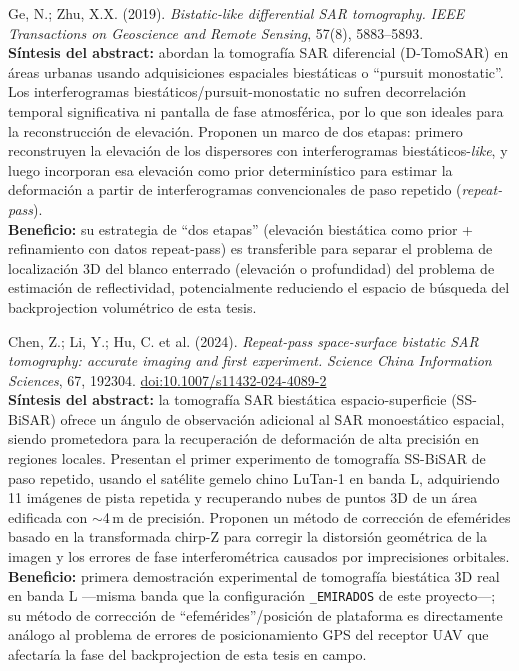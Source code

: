 \documentclass[11pt,a4paper]{article}
\begin{document}
\begin{enumerate}[label=\textbf{[C\arabic*]}, leftmargin=2.2cm, itemsep=10pt]

\item Ge, N.; Zhu, X.X. (2019). \textit{Bistatic-like differential SAR
tomography.} \emph{IEEE Transactions on Geoscience and Remote Sensing},
57(8), 5883--5893. \cite{ge2019}\\
\textbf{Síntesis del abstract:} abordan la tomografía SAR diferencial
(D-TomoSAR) en áreas urbanas usando adquisiciones espaciales biestáticas o
``pursuit monostatic''. Los interferogramas biestáticos/pursuit-monostatic
no sufren decorrelación temporal significativa ni pantalla de fase
atmosférica, por lo que son ideales para la reconstrucción de elevación.
Proponen un marco de dos etapas: primero reconstruyen la elevación de los
dispersores con interferogramas biestáticos-\emph{like}, y luego incorporan
esa elevación como prior determinístico para estimar la deformación a
partir de interferogramas convencionales de paso repetido
(\emph{repeat-pass}).\\
\textbf{Beneficio:} su estrategia de ``dos etapas'' (elevación biestática
como prior + refinamiento con datos repeat-pass) es transferible para
separar el problema de localización 3D del blanco enterrado (elevación o
profundidad) del problema de estimación de reflectividad, potencialmente
reduciendo el espacio de búsqueda del backprojection volumétrico de esta
tesis.

\item Chen, Z.; Li, Y.; Hu, C. et al. (2024). \textit{Repeat-pass
space-surface bistatic SAR tomography: accurate imaging and first
experiment.} \emph{Science China Information Sciences}, 67, 192304.
\href{https://doi.org/10.1007/s11432-024-4089-2}{doi:10.1007/s11432-024-4089-2}
\cite{chenz2024}\\
\textbf{Síntesis del abstract:} la tomografía SAR biestática
espacio-superficie (SS-BiSAR) ofrece un ángulo de observación adicional al
SAR monoestático espacial, siendo prometedora para la recuperación de
deformación de alta precisión en regiones locales. Presentan el primer
experimento de tomografía SS-BiSAR de paso repetido, usando el satélite
gemelo chino LuTan-1 en banda L, adquiriendo 11 imágenes de pista repetida
y recuperando nubes de puntos 3D de un área edificada con
$\sim$4\,m de precisión. Proponen un método de corrección de efemérides
basado en la transformada chirp-Z para corregir la distorsión geométrica de
la imagen y los errores de fase interferométrica causados por
imprecisiones orbitales.\\
\textbf{Beneficio:} primera demostración experimental de tomografía
biestática 3D real en banda L —misma banda que la configuración
\texttt{\_EMIRADOS} de este proyecto—; su método de corrección de
``efemérides''/posición de plataforma es directamente análogo al problema
de errores de posicionamiento GPS del receptor UAV que afectaría la fase
del backprojection de esta tesis en campo.


\end{enumerate}
\end{document}
